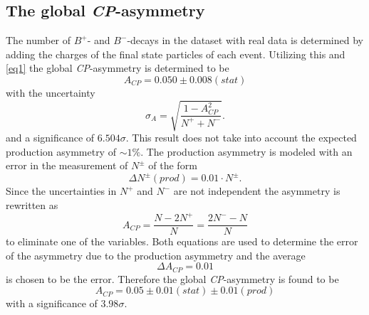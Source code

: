 \subsection{The global \textit{CP}-asymmetry}
The number of $B^+$- and $B^-$-decays in the dataset with real data is determined by adding the charges of the final state
particles of each event. Utilizing this and \autoref{eq1} the global \textit{CP}-asymmetry is determined to be
\begin{equation}
  A_\textit{CP} = 0.050 \pm 0.008 (stat)
\end{equation}
with the uncertainty
\begin{equation}
  \sigma_A = \sqrt{\frac{1-A_\textit{CP}^2}{N^+ + N^-}}.
\end{equation}
and a significance of $6.504 \sigma$. This result does not take into account the expected production asymmetry of $\sim 1\%$.
The production asymmetry is modeled with an error in the measurement of $N^\pm$ of the form
\begin{equation}
  \Delta N^\pm (prod) = 0.01 \cdot N^\pm .
\end{equation}
Since the uncertainties in $N^+$ and $N^-$ are not independent the asymmetry is rewritten as
\begin{equation}
  A_\textit{CP} = \frac{N- 2 N^+}{N} = \frac{2 N^- - N}{N}
\end{equation}
to eliminate one of the variables. Both equations are used to determine the error of the asymmetry due to the production
asymmetry and the average
\begin{equation}
  \Delta A_\textit{CP} = 0.01
\end{equation}
is chosen to be the error.
Therefore the global \textit{CP}-asymmetry is found to be
\begin{equation}
  A_\textit{CP} = 0.05 \pm 0.01 (stat) \pm 0.01 (prod)
\end{equation}
with a significance of $3.98\sigma$.




